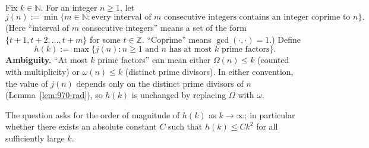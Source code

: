 \\
Fix $k\in\mathbb{N}$. For an integer $n\ge 1$, let
\[
 j(n) := \min\{m\in\mathbb{N}: \text{every interval of $m$ consecutive integers contains an integer coprime to $n$}\}.
\]
(Here ``interval of $m$ consecutive integers'' means a set of the form $\{t+1,t+2,\dots,t+m\}$ for some $t\in\mathbb{Z}$.  ``Coprime'' means $\gcd(\cdot,\cdot)=1$.)
Define
\[
 h(k) := \max\{ j(n): n\ge 1\text{ and $n$ has at most $k$ prime factors}\}.
\]
\textbf{Ambiguity.} ``At most $k$ prime factors'' can mean either $\Omega(n)\le k$ (counted with multiplicity) or $\omega(n)\le k$ (distinct prime divisors).  In either convention, the value of $j(n)$ depends only on the distinct prime divisors of $n$ (Lemma~\ref{lem:970-rad}), so $h(k)$ is unchanged by replacing $\Omega$ with $\omega$.

The question asks for the order of magnitude of $h(k)$ as $k\to\infty$; in particular whether there exists an absolute constant $C$ such that $h(k)\le C k^2$ for all sufficiently large $k$.
